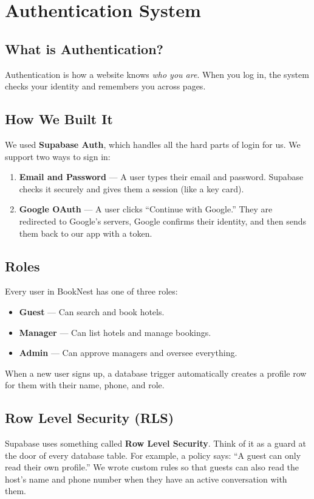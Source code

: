 \documentclass[12pt,a4paper]{article}
\begin{document}
\newpage
\section{Authentication System}

\subsection{What is Authentication?}
Authentication is how a website knows \textit{who you are}. When you log in, the system checks your identity and remembers you across pages.

\subsection{How We Built It}

We used \textbf{Supabase Auth}, which handles all the hard parts of login for us. We support two ways to sign in:

\begin{enumerate}
  \item \textbf{Email and Password} --- A user types their email and password. Supabase checks it securely and gives them a session (like a key card).
  \item \textbf{Google OAuth} --- A user clicks ``Continue with Google.'' They are redirected to Google's servers, Google confirms their identity, and then sends them back to our app with a token.
\end{enumerate}

\subsection{Roles}
Every user in BookNest has one of three roles:
\begin{itemize}
  \item \textbf{Guest} --- Can search and book hotels.
  \item \textbf{Manager} --- Can list hotels and manage bookings.
  \item \textbf{Admin} --- Can approve managers and oversee everything.
\end{itemize}

When a new user signs up, a database trigger automatically creates a profile row for them with their name, phone, and role.

\subsection{Row Level Security (RLS)}
Supabase uses something called \textbf{Row Level Security}. Think of it as a guard at the door of every database table. For example, a policy says: ``A guest can only read their own profile.'' We wrote custom rules so that guests can also read the host's name and phone number when they have an active conversation with them.
\end{document}
